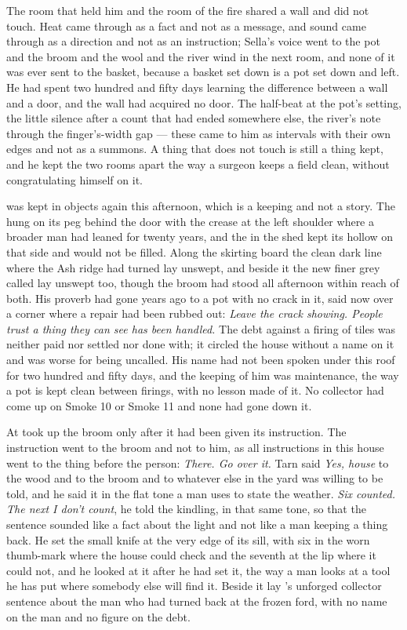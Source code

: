 The room that held him and the room of the fire shared a wall and did not touch. Heat came through as a fact and not as a message, and sound came through as a direction and not as an instruction; Sella's voice went to the pot and the broom and the wool and the river wind in the next room, and none of it was ever sent to the basket, because a basket set down is a pot set down and left. He had spent two hundred and fifty days learning the difference between a wall and a door, and the wall had acquired no door. The half-beat at the pot's setting, the little silence after a count that had ended somewhere else, the river's note through the finger's-width gap --- these came to him as intervals with their own edges and not as a summons. A thing that does not touch is still a thing kept, and he kept the two rooms apart the way a surgeon keeps a field clean, without congratulating himself on it.

 was kept in objects again this afternoon, which is a keeping and not a story. The  hung on its peg behind the door with the crease at the left shoulder where a broader man had leaned for twenty years, and the  in the shed kept its hollow on that side and would not be filled. Along the skirting board the clean dark line where the Ash ridge had turned lay unswept, and beside it the new finer grey called  lay unswept too, though the broom had stood all afternoon within reach of both. His proverb had gone years ago to a pot with no crack in it, said now over a corner where a repair had been rubbed out: \emph{Leave the crack showing. People trust a thing they can see has been handled.} The debt against a firing of tiles was neither paid nor settled nor done with; it circled the house without a name on it and was worse for being uncalled. His name had not been spoken under this roof for two hundred and fifty days, and the keeping of him was maintenance, the way a pot is kept clean between firings, with no lesson made of it. No collector had come up  on Smoke 10 or Smoke 11 and none had gone down it.

\scenebreak

At   took up the broom only after it had been given its instruction. The instruction went to the broom and not to him, as all instructions in this house went to the thing before the person: \emph{There. Go over it.} Tarn said \emph{Yes, house} to the wood and to the broom and to whatever else in the yard was willing to be told, and he said it in the flat tone a man uses to state the weather. \emph{Six counted. The next I don't count}, he told the kindling, in that same tone, so that the sentence sounded like a fact about the light and not like a man keeping a thing back. He set the small knife at the very edge of its sill, with six in the worn thumb-mark where the house could check and the seventh at the lip where it could not, and he looked at it after he had set it, the way a man looks at a tool he has put where somebody else will find it. Beside it lay 's unforged collector sentence about the man who had turned back at the frozen ford, with no name on the man and no figure on the debt.

